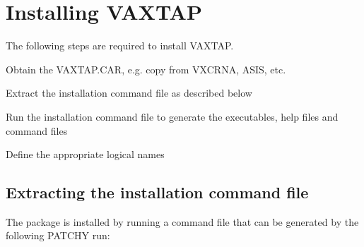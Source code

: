 \chapter{Installing VAXTAP}
\par
The following steps are required to install VAXTAP.
\begin{OL}
\item
Obtain the VAXTAP.CAR, e.g. copy from VXCRNA, ASIS, etc.
\item
Extract the installation command file as described below
\item
Run the installation command file to generate the executables,
help files and command files
\item
Define the appropriate logical names
\end{OL}
\section{Extracting the installation command file}
The package is installed by running a command file that can
be generated by the following PATCHY run:
